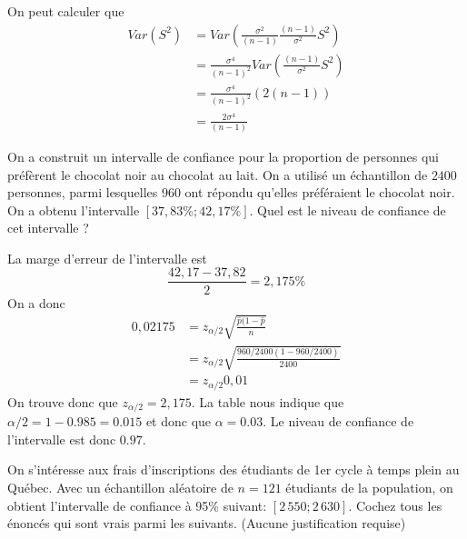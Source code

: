 \begin{questions}
\begin{solution}
On peut calculer que 
\begin{align*}
Var(S^2) &= Var\left( \frac{\sigma^2}{(n-1)}\frac{(n-1)}{\sigma^2}S^2 \right)\\
    &= \frac{\sigma^4}{(n-1)^2} Var\left(\frac{(n-1)}{\sigma^2}S^2\right)  \\
    &= \frac{\sigma^4}{(n-1)^2}(2(n-1)) \\
    &= \frac{2\sigma^4}{(n-1)}
\end{align*}
\end{solution}


\newpage

\question[8]
On a construit un intervalle de confiance pour la proportion de personnes qui préfèrent le chocolat noir au chocolat au lait. On a utilisé un échantillon de $2400$ personnes, parmi lesquelles $960$ ont répondu qu’elles préféraient le chocolat noir. On a obtenu l’intervalle $[37, 83\%; 42, 17\%]$. Quel est le niveau de confiance de cet intervalle ?

\begin{solution}
La marge d'erreur de l'intervalle est 
$$ \frac{42,17-37,82}{2} = 2,175\%$$ 
On a donc 
\begin{align*}
0,02175 &= z_{\alpha/2}\sqrt{\frac{\hat{p}{(1-\hat{p}}}{n}} \\ 
&= z_{\alpha/2} \sqrt{\frac{960/2400{(1-960/2400)}}{2400}}\\
&= z_{\alpha/2} 0,01
\end{align*}
On trouve donc que $z_{\alpha/2} = 2,175$. La table nous indique que $\alpha/2 = 1-0.985 = 0.015$ et donc que $\alpha = 0.03$. Le niveau de confiance de l'intervalle est donc $0.97$. 
\end{solution}
\vspace{13cm}

\question[4]
On s'intéresse aux frais d'inscriptions des étudiants de 1er cycle à temps plein au Québec. 
Avec un échantillon aléatoire de $n=121$ étudiants de la population, on obtient l'intervalle de confiance à 95\% suivant: $[2\,550;2\,630]$. 
Cochez tous les énoncés qui sont vrais parmi les suivants. (Aucune justification requise)


\end{questions}
